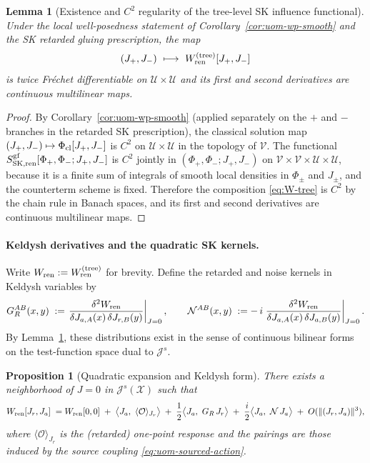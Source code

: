 \documentclass[10pt]{article}
\theoremstyle{definition}
\theoremstyle{plain}
\newtheorem{lemma}{Lemma}[section]
\newtheorem{proposition}{Proposition}[section]
\begin{document}
\begin{lemma}[Existence and $C^2$ regularity of the tree-level SK influence functional]
\label{lem:W-C2}
Under the local well-posedness statement of Corollary~\ref{cor:uom-wp-smooth} and the SK retarded gluing prescription, the map
\[
(J_+,J_-)\ \longmapsto\ W_{\rm ren}^{\rm (tree)}[J_+,J_-]
\]
is twice Fr\'echet differentiable on $\mathcal U\times \mathcal U$ and its first and second derivatives are continuous multilinear maps.
\end{lemma}

\begin{proof}
By Corollary~\ref{cor:uom-wp-smooth} (applied separately on the $+$ and $-$ branches in the retarded SK prescription),
the classical solution map $(J_+,J_-)\mapsto \Phi_{\rm cl}[J_+,J_-]$ is $C^2$ on $\mathcal U\times\mathcal U$ in the topology of $\mathcal V$.
The functional $S_{\rm SK,ren}^{\rm gf}[\Phi_+,\Phi_-;J_+,J_-]$ is $C^2$ jointly in $(\Phi_+,\Phi_-;J_+,J_-)$ on $\mathcal V\times\mathcal V\times\mathcal U\times\mathcal U$,
because it is a finite sum of integrals of smooth local densities in $\Phi_\pm$ and $J_\pm$, and the counterterm scheme is fixed.
Therefore the composition \eqref{eq:W-tree} is $C^2$ by the chain rule in Banach spaces, and its first and second derivatives
are continuous multilinear maps.
\end{proof}

\paragraph{Keldysh derivatives and the quadratic SK kernels.}
Write $W_{\rm ren}:=W_{\rm ren}^{\rm (tree)}$ for brevity.
Define the retarded and noise kernels in Keldysh variables by
\begin{equation}
G_R^{AB}(x,y)
\;:=
\left.\frac{\delta^2 W_{\rm ren}}{\delta J_{a,A}(x)\,\delta J_{r,B}(y)}\right|_{J=0},
\qquad
\mathcal N^{AB}(x,y)
\;:=
-\,i\left.\frac{\delta^2 W_{\rm ren}}{\delta J_{a,A}(x)\,\delta J_{a,B}(y)}\right|_{J=0}.
\label{eq:GR-N-def}
\end{equation}
By Lemma~\ref{lem:W-C2}, these distributions exist in the sense of continuous bilinear forms on the test-function space
dual to $\mathcal J^s$.

\begin{proposition}[Quadratic expansion and Keldysh form]
\label{prop:W-quadratic}
There exists a neighborhood of $J=0$ in $\mathcal J^s(\mathscr X)$ such that
\begin{equation}
W_{\rm ren}[J_r,J_a]
\;=
W_{\rm ren}[0,0]
\; +\;\big\langle J_a,\ \langle \mathcal O\rangle_{J_r}\big\rangle
\; +\;\frac12\big\langle J_a,\ G_R\,J_r\big\rangle
\; +\;\frac{i}{2}\big\langle J_a,\ \mathcal N\,J_a\big\rangle
\; +\;O(\|(J_r,J_a)\|^3),
\label{eq:W-keldysh-expansion}
\end{equation}
where $\langle\mathcal O\rangle_{J_r}$ is the (retarded) one-point response and the pairings are those induced by the source coupling
\eqref{eq:uom-sourced-action}.
\end{proposition}
\end{document}
